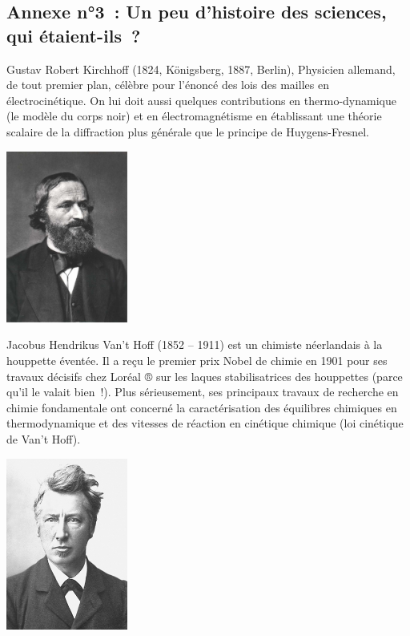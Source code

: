\documentclass{article}
\newenvironment{Figure}
  {\par\medskip\noindent\minipage{\linewidth}}
  {\endminipage\par\medskip}
\begin{document}
\subsection*{Annexe n°3~: Un peu d’histoire des sciences, qui étaient-ils~?}
\begin{multicols*}{4}


Gustav Robert Kirchhoff (1824, Königsberg, 1887, Berlin), Physicien allemand, de tout premier plan, célèbre pour l'énoncé des lois des mailles en électrocinétique. 
On lui doit aussi quelques contributions en thermo-dynamique (le modèle du corps noir) et en électromagnétisme en établissant une théorie scalaire de la diffraction plus générale que le principe de Huygens-Fresnel.
\begin{Figure}
    \centering
    \includegraphics[width=4cm]{ressources/Gustav_Robert_Kirchhoff.jpg}
\end{Figure}
\columnbreak

Jacobus Hendrikus Van’t Hoff (1852 – 1911) est un chimiste néerlandais à la houppette éventée. Il a reçu le premier prix Nobel de chimie en 1901 pour ses travaux décisifs chez Loréal ® sur les laques stabilisatrices des houppettes (parce qu’il le valait bien~!). Plus sérieusement, ses principaux travaux de recherche en chimie fondamentale ont concerné la caractérisation des équilibres chimiques en thermodynamique et des vitesses de réaction en cinétique chimique (loi cinétique de Van’t Hoff).
\begin{Figure}
    \centering
    \includegraphics[width=4cm]{ressources/Vant_Hoff.jpg}
\end{Figure}
\end{multicols*}
\end{document}
